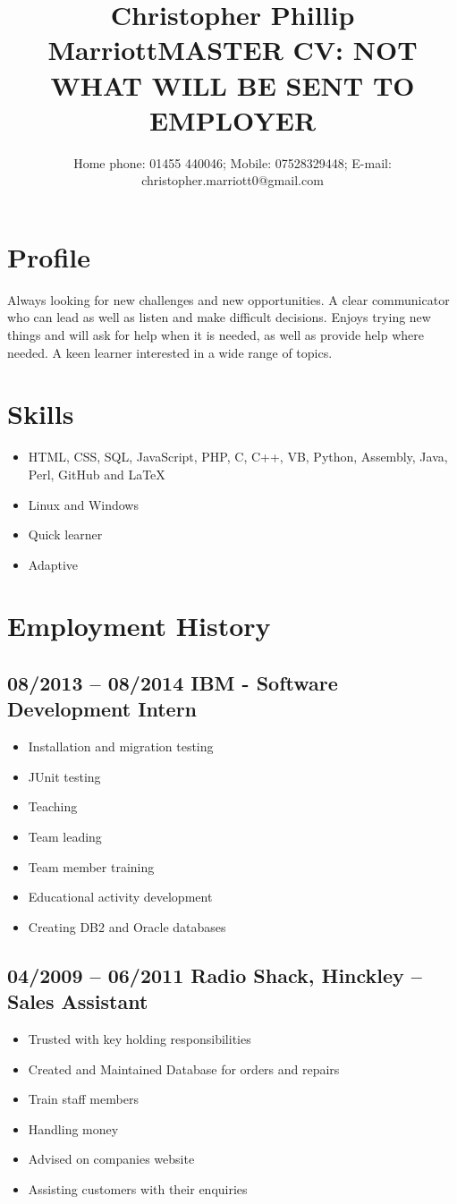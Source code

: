 \documentclass[0pt]{article}
\title{Christopher Phillip Marriott}
\title{MASTER CV: NOT WHAT WILL BE SENT TO EMPLOYER}
\date{Home phone: 01455  440046; Mobile: 07528329448; E-mail: christopher.marriott0@gmail.com}
\begin{document}
\maketitle
\thispagestyle{empty}
\pagestyle{empty}

\section*{Profile}
Always looking for new challenges and new opportunities. A clear communicator who can lead as well as listen and make difficult decisions. Enjoys trying new things and will ask for help when it is needed, as well as provide help where needed.  A keen learner interested in a wide range of topics.


\section*{Skills}
\begin{itemize}
	\item HTML, CSS, SQL, JavaScript, PHP, C, C++, VB, Python, Assembly, Java, Perl, GitHub and LaTeX 
	\item Linux and Windows
	\item Quick learner
	\item Adaptive
\end{itemize}

\section*{Employment History}

\subsection*{08/2013 -- 08/2014   IBM - Software Development Intern}
\begin{itemize}
	\item Installation and migration testing
	\item JUnit testing 
	\item Teaching
	\item Team leading
	\item Team member training 
	\item Educational activity development
	\item Creating DB2 and Oracle databases 
\end{itemize}

\subsection*{04/2009 -- 06/2011   Radio Shack, Hinckley -- Sales Assistant}
\begin{itemize}
	\item Trusted with key holding responsibilities
	\item Created and Maintained Database for orders and repairs
	\item Train staff members
	\item Handling money
	\item Advised on companies website
	\item Assisting customers with their enquiries
\end{itemize}
	
\end{document}
